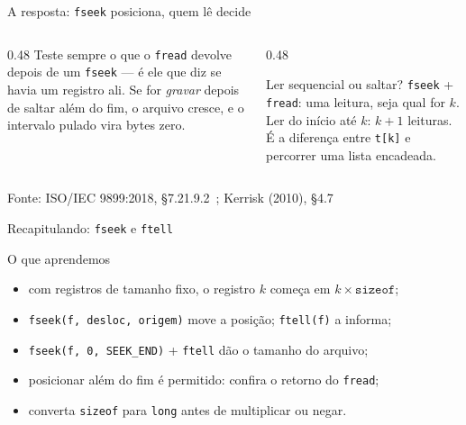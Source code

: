 \documentclass[aspectratio=169]{beamer}
\newcommand{\fonte}[1]{\vfill\hfill{\scriptsize\textcolor{UFSGray}{Fonte: #1}}}
\begin{document}
\begin{frame}{A resposta: \texttt{fseek} posiciona, quem lê decide}
  \begin{center}
  \end{center}
  \vspace{-0.3em}
  \begin{columns}[T]
    \begin{column}{0.48\textwidth}
      \small Teste sempre o que o \texttt{fread} devolve depois de um
      \texttt{fseek} --- é ele que diz se havia um registro ali. Se for
      \emph{gravar} depois de saltar além do fim, o arquivo cresce, e o
      intervalo pulado vira bytes zero.
    \end{column}
    \begin{column}{0.48\textwidth}
      \begin{block}{Ler sequencial ou saltar?}
        \small \texttt{fseek} + \texttt{fread}: uma leitura, seja qual for
        $k$. Ler do início até $k$: $k+1$ leituras. É a diferença entre
        \texttt{t[k]} e percorrer uma lista encadeada.
      \end{block}
    \end{column}
  \end{columns}
  \fonte{ISO/IEC 9899:2018, §7.21.9.2~\cite{iso2018c17};
    Kerrisk (2010), §4.7~\cite{kerrisk2010linux}}
\end{frame}

\begin{frame}{Recapitulando: \texttt{fseek} e \texttt{ftell}}
  \begin{block}{O que aprendemos}
    \begin{itemize}
      \item com registros de tamanho fixo, o registro $k$ começa em
        $k \times \mathtt{sizeof}$;
      \item \texttt{fseek(f, desloc, origem)} move a posição;
        \texttt{ftell(f)} a informa;
      \item \texttt{fseek(f, 0, SEEK\_END)} + \texttt{ftell} dão o tamanho
        do arquivo;
      \item posicionar além do fim é permitido: confira o retorno do
        \texttt{fread};
      \item converta \texttt{sizeof} para \texttt{long} antes de
        multiplicar ou negar.
    \end{itemize}
  \end{block}
\end{frame}
\end{document}

